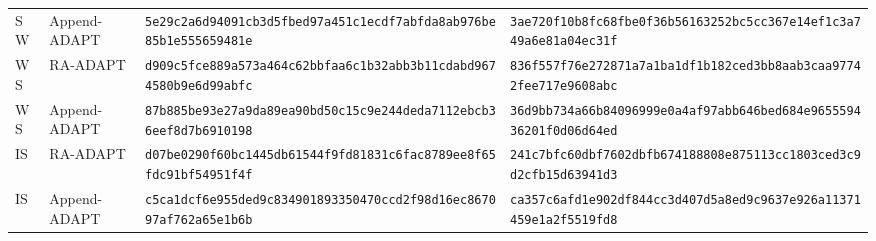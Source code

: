 \documentclass[10pt,letterpaper]{article}
\begin{document}
\begin{longtable}{@{}llp{2.55in}p{2.55in}@{}}
SW & Append-ADAPT & \texttt{5e29c2a6}\allowbreak{}\texttt{d94091cb}\allowbreak{}\texttt{3d5fbed9}\allowbreak{}\texttt{7a451c1e}\allowbreak{}\texttt{cdf7abfd}\allowbreak{}\texttt{a8ab976b}\allowbreak{}\texttt{e85b1e55}\allowbreak{}\texttt{5659481e}\allowbreak{} & \texttt{3ae720f1}\allowbreak{}\texttt{0b8fc68f}\allowbreak{}\texttt{be0f36b5}\allowbreak{}\texttt{6163252b}\allowbreak{}\texttt{c5cc367e}\allowbreak{}\texttt{14ef1c3a}\allowbreak{}\texttt{749a6e81}\allowbreak{}\texttt{a04ec31f}\allowbreak{} \\
WS & RA-ADAPT & \texttt{d909c5fc}\allowbreak{}\texttt{e889a573}\allowbreak{}\texttt{a464c62b}\allowbreak{}\texttt{bfaa6c1b}\allowbreak{}\texttt{32abb3b1}\allowbreak{}\texttt{1cdabd96}\allowbreak{}\texttt{74580b9e}\allowbreak{}\texttt{6d99abfc}\allowbreak{} & \texttt{836f557f}\allowbreak{}\texttt{76e27287}\allowbreak{}\texttt{1a7a1ba1}\allowbreak{}\texttt{df1b182c}\allowbreak{}\texttt{ed3bb8aa}\allowbreak{}\texttt{b3caa977}\allowbreak{}\texttt{42fee717}\allowbreak{}\texttt{e9608abc}\allowbreak{} \\
WS & Append-ADAPT & \texttt{87b885be}\allowbreak{}\texttt{93e27a9d}\allowbreak{}\texttt{a89ea90b}\allowbreak{}\texttt{d50c15c9}\allowbreak{}\texttt{e244deda}\allowbreak{}\texttt{7112ebcb}\allowbreak{}\texttt{36eef8d7}\allowbreak{}\texttt{b6910198}\allowbreak{} & \texttt{36d9bb73}\allowbreak{}\texttt{4a66b840}\allowbreak{}\texttt{96999e0a}\allowbreak{}\texttt{4af97abb}\allowbreak{}\texttt{646bed68}\allowbreak{}\texttt{4e965559}\allowbreak{}\texttt{436201f0}\allowbreak{}\texttt{d06d64ed}\allowbreak{} \\
IS & RA-ADAPT & \texttt{d07be029}\allowbreak{}\texttt{0f60bc14}\allowbreak{}\texttt{45db6154}\allowbreak{}\texttt{4f9fd818}\allowbreak{}\texttt{31c6fac8}\allowbreak{}\texttt{789ee8f6}\allowbreak{}\texttt{5fdc91bf}\allowbreak{}\texttt{54951f4f}\allowbreak{} & \texttt{241c7bfc}\allowbreak{}\texttt{60dbf760}\allowbreak{}\texttt{2dbfb674}\allowbreak{}\texttt{188808e8}\allowbreak{}\texttt{75113cc1}\allowbreak{}\texttt{803ced3c}\allowbreak{}\texttt{9d2cfb15}\allowbreak{}\texttt{d63941d3}\allowbreak{} \\
IS & Append-ADAPT & \texttt{c5ca1dcf}\allowbreak{}\texttt{6e955ded}\allowbreak{}\texttt{9c834901}\allowbreak{}\texttt{89335047}\allowbreak{}\texttt{0ccd2f98}\allowbreak{}\texttt{d16ec867}\allowbreak{}\texttt{097af762}\allowbreak{}\texttt{a65e1b6b}\allowbreak{} & \texttt{ca357c6a}\allowbreak{}\texttt{fd1e902d}\allowbreak{}\texttt{f844cc3d}\allowbreak{}\texttt{407d5a8e}\allowbreak{}\texttt{d9c9637e}\allowbreak{}\texttt{926a1137}\allowbreak{}\texttt{1459e1a2}\allowbreak{}\texttt{f5519fd8}\allowbreak{} \\

\end{longtable}
\end{document}
